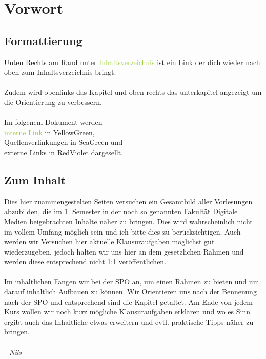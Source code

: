 \section{Vorwort}
    \subsection{Formattierung}
Unten Rechts am Rand unter \textcolor{YellowGreen}{Inhaltsverzeichnis} ist ein Link der dich wieder nach oben zum Inhaltsverzeichnis bringt.\\~\\
Zudem wird obenlinks das Kapitel und oben rechts das unterkapitel angezeigt um die Orientierung zu verbessern.\\~\\
Im folgenem Dokument werden \\
\textcolor{YellowGreen}{interne Link} in YellowGreen,   \\   
\textcolor{Cerulean}{Quellenverlinkungen} in SeaGreen und \\         
\textcolor{RedViolet}{externe Links} in  RedViolet dargesellt.
    \subsection{Zum Inhalt}
Dies hier zuammengestelten Seiten versuchen ein Gesamtbild aller Vorlesungen abzubilden, die im 1. Semester in der noch so genannten Fakultät Digitale Medien beigebrachten Inhalte näher zu bringen. Dies wird wahrscheinlich nicht im vollem Umfang möglich sein und ich bitte dies zu berücksichtigen. Auch werden wir Versuchen hier aktuelle Klausuraufgaben möglichst gut wiederzugeben, jedoch halten wir uns hier an dem gesetzlichen Rahmen und werden diese entsprechend nicht 1:1 veröffentlichen.\\~\\
Im inhaltlichen Fangen wir bei der SPO an, um einen Rahmen zu bieten und um darauf inhaltlich Aufbauen zu können. Wir Orientieren uns nach der Bennenung nach der SPO und entsprechend sind die Kapitel getaltet. Am Ende von jedem Kurs wollen wir noch kurz mögliche Klausuraufgaben erklären und wo es Sinn ergibt auch das Inhaltliche etwas erweitern und evtl. praktische Tipps näher zu bringen.\\~\\
\emph{- Nils}